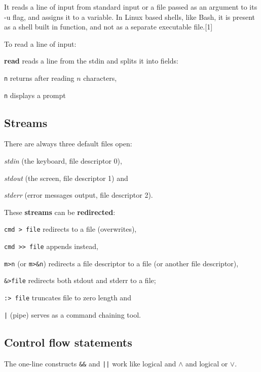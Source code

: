  It reads a line of input from standard input or a file passed as an argument to its -u flag, and assigns it to a variable. In Linux based shells, like Bash, it is present as a shell built in function, and not as a separate executable file.[1]

To read a line of input:
\begin{enumx}
\item [\cmd] \textbf{read} reads a line from the stdin and splits it into fields:
\item [\texttt{n}] returns after reading $n$ characters, 
\item [\texttt{n}] displays a prompt 
\end{enumx}

\subsection{Streams}
There are always three default files open:
\begin{enumx}
\item \emph{stdin} (the keyboard, file descriptor 0),
\item \emph{stdout} (the screen, file descriptor 1) and
\item \emph{stderr} (error messages output, file descriptor 2).
\end{enumx}

These \textbf{streams} can be \textbf{redirected}:
\begin{itemx} 
\item \texttt{cmd > file} redirects to a file (overwrites),
\item \texttt{cmd >{}> file} appends instead,
\item \texttt{m>n} (or \texttt{m>\&n}) redirects a file descriptor to a file 
(or another file descriptor), 
\item \texttt{\&>file} redirects both stdout and stderr to a file;
\item \texttt{:> file} truncates file to zero length and
\item \texttt{|} (pipe) serves as a command chaining tool.
\end{itemx}

\subsection{Control flow statements}
The one-line constructs \texttt{\&\&} and \texttt{||} work like logical and $\wedge$ and logical or $\vee$.


